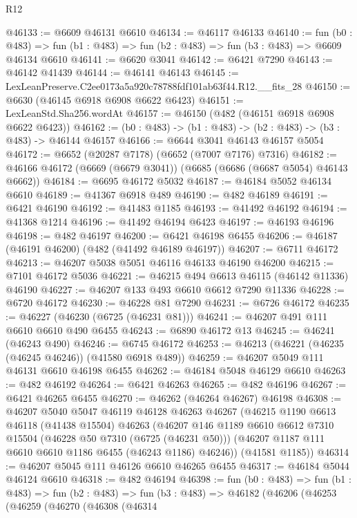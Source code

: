 \begin{lexlean}{R12}
\begin{coremodule}
@46133 := @6609 @46131 @6610
@46134 := @46117 @46133
@46140 := fun (b0 : @483) =>
  fun (b1 : @483) => fun (b2 : @483) => fun (b3 : @483) => @6609 @46134 @6610
@46141 := @6620 @3041
@46142 := @6421 @7290
@46143 := @46142 @41439
@46144 := @46141 @46143
@46145 := LexLeanPreserve.C2ee0173a5a920c78788fdf101ab63f44.R12.__fits_28
@46150 := @6630 (@46145 @6918 @6908 @6622 @6423)
@46151 := LexLeanStd.Sha256.wordAt
@46157 := @46150 (@482 (@46151 @6918 @6908 @6622 @6423))
@46162 := (b0 : @483) -> (b1 : @483) -> (b2 : @483) -> (b3 : @483) -> @46144 @46157
@46166 := @6644 @3041 @46143 @46157 @5054
@46172 := @6652 (@20287 @7178) (@6652 (@7007 @7176) @7316)
@46182 := @46166 @46172 (@6669 (@6679 @3041)) (@6685 (@6686 (@6687 @5054) @46143 @6662))
@46184 := @6695 @46172 @5032
@46187 := @46184 @5052 @46134 @6610
@46189 := @41367 @6918 @489
@46190 := @482 @46189
@46191 := @6421 @46190
@46192 := @41483 @1185
@46193 := @41492 @46192
@46194 := @41368 @1214
@46196 := @41492 @46194 @6423
@46197 := @46193 @46196
@46198 := @482 @46197
@46200 := @6421 @46198 @6455
@46206 := @46187 (@46191 @46200) (@482 (@41492 @46189 @46197))
@46207 := @6711 @46172
@46213 := @46207 @5038 @5051 @46116 @46133 @46190 @46200
@46215 := @7101 @46172 @5036
@46221 := @46215 @494 @6613 @46115 (@46142 @11336) @46190
@46227 := @46207 @133 @493 @6610 @6612 @7290 @11336
@46228 := @6720 @46172
@46230 := @46228 @81 @7290
@46231 := @6726 @46172
@46235 := @46227 (@46230 (@6725 (@46231 @81)))
@46241 := @46207 @491 @111 @6610 @6610 @490 @6455
@46243 := @6890 @46172 @13
@46245 := @46241 (@46243 @490)
@46246 := @6745 @46172
@46253 := @46213 (@46221 (@46235 (@46245 @46246)) (@41580 @6918 @489))
@46259 := @46207 @5049 @111 @46131 @6610 @46198 @6455
@46262 := @46184 @5048 @46129 @6610
@46263 := @482 @46192
@46264 := @6421 @46263
@46265 := @482 @46196
@46267 := @6421 @46265 @6455
@46270 := @46262 (@46264 @46267) @46198
@46308 := @46207
    @5040
    @5047
    @46119
    @46128
    @46263
    @46267
    (@46215
      @1190
      @6613
      @46118
      (@41438 @15504)
      @46263
      (@46207
        @146
        @1189
        @6610
        @6612
        @7310
        @15504
        (@46228 @50 @7310 (@6725 (@46231 @50)))
        (@46207 @1187 @111 @6610 @6610 @1186 @6455 (@46243 @1186) @46246))
      (@41581 @1185))
@46314 := @46207 @5045 @111 @46126 @6610 @46265 @6455
@46317 := @46184 @5044 @46124 @6610
@46318 := @482 @46194
@46398 := fun (b0 : @483) =>
  fun (b1 : @483) =>
  fun (b2 : @483) =>
  fun (b3 : @483) =>
  @46182
    (@46206
      (@46253
        (@46259
          (@46270
            (@46308
              (@46314

\end{coremodule}
\end{lexlean}

